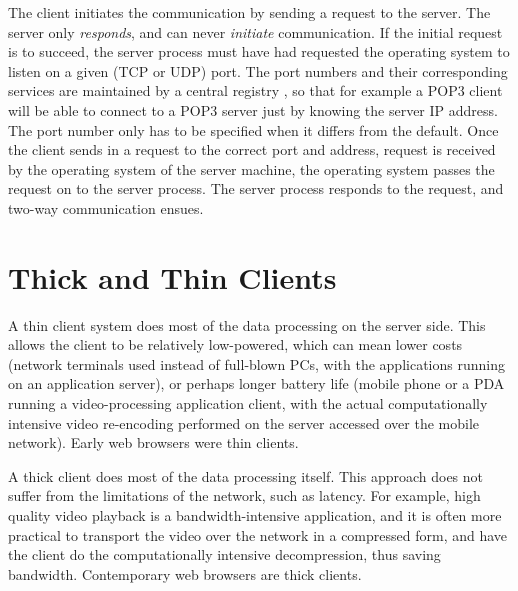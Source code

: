\documentclass[10pt]{report}
\begin{document}
The client initiates the communication by sending a request to the
server.  The server only {\em responds}, and can never {\em initiate}
communication.  If the initial request is to succeed, the server process
must have had requested the operating system to listen on a given (TCP
or UDP) port.  The port numbers and their corresponding services are
maintained by a central registry \cite{iana}, so that for example a POP3
client will be able to connect to a POP3 server just by knowing the
server IP address.  The port number only has to be specified when it differs
from the default.  Once the client sends in a request to the correct port and
address, request is received by the operating system of the server machine, the
operating system passes the request on to the server process.  The server
process responds to the request, and two-way communication ensues.


\section{Thick and Thin Clients}

A thin client system does most of the data processing on the server side.  This
allows the client to be relatively low-powered, which can mean lower costs
(network terminals used instead of full-blown PCs, with the applications running
on an application server), or perhaps longer battery life (mobile phone or a PDA
running a video-processing application client, with the actual computationally
intensive video re-encoding performed on the server accessed over the mobile network).  Early web browsers were thin clients.

A thick client does most of the data processing itself.  This approach
does not suffer from the limitations of the network, such as latency.
For example, high quality video playback is a bandwidth-intensive
application, and it is often more practical to transport the video over
the network in a compressed form, and have the client do the
computationally intensive decompression, thus saving bandwidth.
Contemporary web browsers are thick clients.


\end{document}
